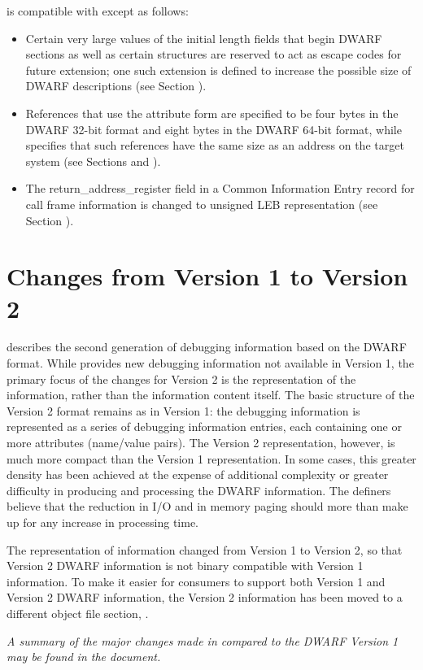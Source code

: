 is compatible with 
 except as follows:
\begin{itemize}
\item
Certain very large values of the initial length fields that
begin DWARF sections as well as certain structures are reserved
to act as escape codes for future extension; one such extension
is defined to increase the possible size of DWARF descriptions
(see Section ).
\item
References that use the attribute form 
\DWFORMrefaddrNAME{}
are specified to be four bytes in the DWARF 32-bit format and
eight bytes in the DWARF 64-bit format, while 
specifies that such references have the same size as an
address on the target system (see Sections 
 and 
).
\item
The return\_address\_register field in a Common Information
Entry record for call frame information is changed to unsigned
LEB representation (see Section 
).
\end{itemize}

\section{Changes from Version 1 to Version 2}
describes the second generation of debugging
information based on the DWARF format. While 
provides new debugging information not available in
Version 1, the primary focus of the changes for Version
2 is the representation of the information, rather than
the information content itself. The basic structure of
the Version 2 format remains as in Version 1: the debugging
information is represented as a series of debugging information
entries, each containing one or more attributes (name/value
pairs). The Version 2 representation, however, is much more
compact than the Version 1 representation. In some cases,
this greater density has been achieved at the expense of
additional complexity or greater difficulty in producing and
processing the DWARF information. The definers believe that the
reduction in I/O and in memory paging should more than make
up for any increase in processing time.  

The representation
of information changed from Version 1 to Version 2, so that
Version 2 DWARF information is not binary compatible with
Version 1 information. To make it easier for consumers to
support both Version 1 and Version 2 DWARF information, the
Version 2 information has been moved to a different object
file section, \dotdebuginfo{}.  

\textit{
A summary of the major changes made in 
compared to the DWARF Version 1 may be found in the 
document.
}

